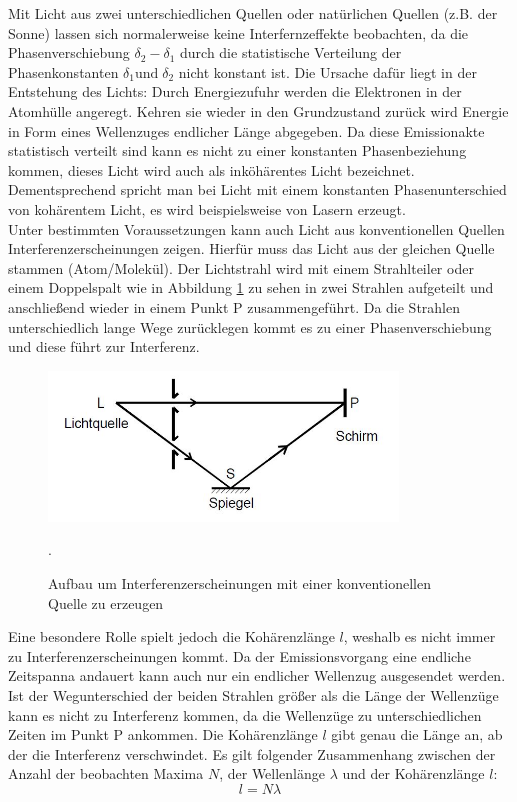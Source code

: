 Mit Licht aus zwei unterschiedlichen Quellen oder natürlichen Quellen (z.B. der Sonne)
lassen sich normalerweise keine Interfernzeffekte beobachten, da die Phasenverschiebung $\delta_{2}-\delta_{1}$ durch
die statistische Verteilung der Phasenkonstanten $\delta_{1} \text{und} \; \delta_{2}$ nicht konstant ist.
Die Ursache dafür liegt in der Entstehung des Lichts: Durch Energiezufuhr werden die Elektronen
in der Atomhülle angeregt. Kehren sie wieder in den Grundzustand zurück wird Energie in
Form eines Wellenzuges endlicher Länge abgegeben. Da diese Emissionakte statistisch verteilt sind kann es nicht zu einer
konstanten Phasenbeziehung kommen, dieses Licht wird auch als inköhärentes Licht bezeichnet.
Dementsprechend spricht man bei Licht mit einem konstanten Phasenunterschied von
kohärentem Licht, es wird beispielsweise von Lasern erzeugt.\\

Unter bestimmten Voraussetzungen kann auch Licht aus konventionellen Quellen Interferenzerscheinungen zeigen.
Hierfür muss das Licht aus der gleichen Quelle stammen (Atom/Molekül). Der Lichtstrahl wird
mit einem Strahlteiler oder einem Doppelspalt wie in Abbildung \ref{fig:doppel} zu sehen
in zwei Strahlen aufgeteilt und anschließend wieder in einem Punkt P
zusammengeführt. Da die Strahlen unterschiedlich lange Wege zurücklegen kommt es zu einer
Phasenverschiebung und diese führt zur Interferenz.

\begin{figure}[H]
  \centering
  \includegraphics[height=4cm]{Unbenannt.JPG}
  \caption{Aufbau um Interferenzerscheinungen mit einer konventionellen Quelle zu erzeugen}
  \label{fig:doppel}
  \cite{skript}.
\end{figure}

Eine besondere Rolle spielt jedoch die Kohärenzlänge $l$, weshalb es nicht immer zu
Interferenzerscheinungen kommt. Da der Emissionsvorgang eine endliche Zeitspanna andauert
kann auch nur ein endlicher Wellenzug ausgesendet werden. Ist der Wegunterschied der beiden Strahlen größer
als die Länge der Wellenzüge kann es nicht zu Interferenz kommen, da die Wellenzüge zu
unterschiedlichen Zeiten im Punkt P ankommen. Die Kohärenzlänge $l$ gibt genau die Länge an, ab der
die Interferenz verschwindet.
Es gilt folgender Zusammenhang zwischen der Anzahl der beobachten Maxima $N$, der
Wellenlänge $\lambda$ und der Kohärenzlänge $l$:
\begin{equation}
  l=N\lambda
\end{equation}

